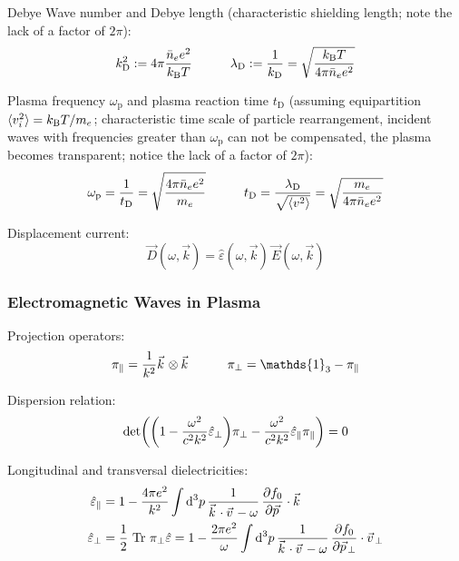 			\noindent
			Debye Wave number and Debye length (characteristic shielding length; note the lack of a factor of $2\pi$):
			\begin{equation}
				k_\text{D}^2 := 4\pi \frac{\bar{n}_e e^2}{k_{\text{B}} T} \hspace{30pt}
				\lambda_\text{D} := \frac{1}{k_\text{D}} = \sqrt{\frac{k_{\text{B}} T}{4\pi \bar{n}_e e^2}}
			\end{equation}

			\noindent
			Plasma frequency $\omega_\text{p}$ and plasma reaction time $t_\text{D}$ (assuming equipartition $\langle v_i^2 \rangle = k_{\text{B}} T / m_e$; characteristic time scale of particle rearrangement, incident waves with frequencies greater than $\omega_\text{p}$ can not be compensated, the plasma becomes transparent; notice the lack of a factor of $2\pi$):
			\begin{equation}
				\omega_\text{p} = \frac{1}{t_\text{D}} = \sqrt{\frac{4\pi\bar{n}_e e^2}{m_e}} \hspace{30pt}
				t_\text{D} = \frac{\lambda_\text{D}}{\sqrt{\langle v^2 \rangle}} = \sqrt{\frac{m_e}{4\pi \bar{n}_e e^2}}
			\end{equation}

			\noindent
			Displacement current:
			\begin{equation}
				\vec{D}(\omega,\vec{k})  = \hat{\varepsilon}(\omega, \vec{k}) \, \vec{E}(\omega, \vec{k})
			\end{equation}

		\subsubsection{Electromagnetic Waves in Plasma}
			Projection operators:
			\begin{equation}
				\pi_\parallel = \frac{1}{k^2}\vec{k}\otimes\vec{k}
				\hsp
				\pi_\perp = \mathds{1}_3 - \pi_\parallel
			\end{equation}

			\noindent
			Dispersion relation:
			\begin{equation}
				\det(\qty(1 - \frac{\omega^2}{c^2 k^2}\hat{\varepsilon}_\perp) \pi_\perp - \frac{\omega^2}{c^2 k^2}\hat{\varepsilon}_\parallel \pi_\parallel) = 0
			\end{equation}

			\noindent
			Longitudinal and transversal dielectricities:
			\begin{equation}
				\begin{aligned}
					\hat{\varepsilon}_{\parallel} &= 1-\frac{4\pi e^{2}}{k^{2}}\int{\mathrm d^{3}}p\,\frac{1}{\vec{k}\cdot\vec{v}-\omega}\,\frac{\partial f_{0}}{\partial\vec{p}}\cdot\vec{k}\\
					\hat{\varepsilon}_{\perp} &= \frac{1}{2}\,\tr\,\pi_{\perp}\hat{\varepsilon}=1-\frac{2\pi e^{2}}{\omega}\int\mathrm{d}^{3}p\,\frac{1}{\vec{k}\cdot\vec{v}-\omega}\,\frac{\partial f_{0}}{\partial\vec{p}_{\perp}}\cdot\vec{v}_{\perp}
				\end{aligned}
			\end{equation}

